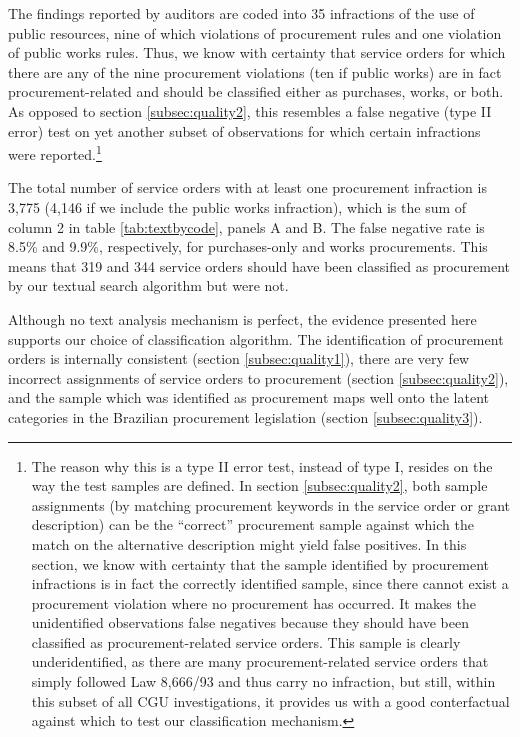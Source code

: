 \documentclass[11pt]{article}
\begin{document}
The findings reported by auditors are coded into 35 infractions of the use of public resources, nine of which violations of procurement rules and one violation of public works rules. Thus, we know with certainty that service orders for which there are any of the nine procurement violations (ten if public works) are in fact procurement-related and should be classified either as purchases, works, or both. As opposed to section \ref{subsec:quality2}, this resembles a false negative (type II error) test on yet another subset of observations for which certain infractions were reported.\footnote{The reason why this is a type II error test, instead of type I, resides on the way the test samples are defined. In section \ref{subsec:quality2}, both sample assignments (by matching procurement keywords in the service order or grant description) can be the ``correct'' procurement sample against which the match on the alternative description might yield false positives. In this section, we know with certainty that the sample identified by procurement infractions is in fact the correctly identified sample, since there cannot exist a procurement violation where no procurement has occurred. It makes the unidentified observations false negatives because they should have been classified as procurement-related service orders. This sample is clearly underidentified, as there are many procurement-related service orders that simply followed Law 8,666/93 and thus carry no infraction, but still, within this subset of all CGU investigations, it provides us with a good conterfactual against which to test our classification mechanism.}



The total number of service orders with at least one procurement infraction is 3,775 (4,146 if we include the public works infraction), which is the sum of column 2 in table \ref{tab:textbycode}, panels A and B. The false negative rate is 8.5\% and 9.9\%, respectively, for purchases-only and works procurements. This means that 319 and 344 service orders should have been classified as procurement by our textual search algorithm but were not.

Although no text analysis mechanism is perfect, the evidence presented here supports our choice of classification algorithm. The identification of procurement orders is internally consistent (section \ref{subsec:quality1}), there are very few incorrect assignments of service orders to procurement (section \ref{subsec:quality2}), and the sample which was identified as procurement maps well onto the latent categories in the Brazilian procurement legislation (section \ref{subsec:quality3}).
\end{document}
